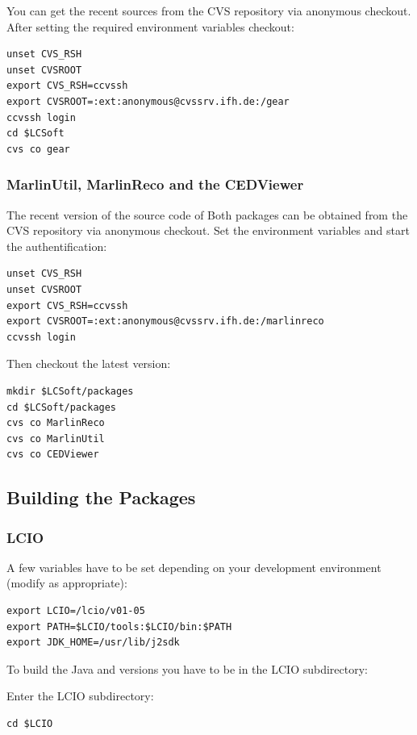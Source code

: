 You can get the recent sources from the CVS repository via anonymous checkout.
After setting the required environment variables checkout:

\begin{verbatim}
unset CVS_RSH
unset CVSROOT
export CVS_RSH=ccvssh
export CVSROOT=:ext:anonymous@cvssrv.ifh.de:/gear
ccvssh login
cd $LCSoft
cvs co gear
\end{verbatim}

\subsubsection*{MarlinUtil, MarlinReco and the CEDViewer}

The recent version of the source code of Both packages can be 
obtained from the CVS repository via anonymous checkout.
Set the environment variables and start the authentification: 

\begin{verbatim}
unset CVS_RSH
unset CVSROOT
export CVS_RSH=ccvssh 
export CVSROOT=:ext:anonymous@cvssrv.ifh.de:/marlinreco
ccvssh login
\end{verbatim}

Then checkout the latest version: 

\begin{verbatim}
mkdir $LCSoft/packages 
cd $LCSoft/packages 
cvs co MarlinReco 
cvs co MarlinUtil 
cvs co CEDViewer 
\end{verbatim}

\subsection{Building the Packages}

\subsubsection*{LCIO}

A few variables have to be set depending on your development
environment (modify as appropriate):

\begin{verbatim}
export LCIO=/lcio/v01-05 
export PATH=$LCIO/tools:$LCIO/bin:$PATH 
export JDK_HOME=/usr/lib/j2sdk
\end{verbatim}

To build the Java and \CPP{} versions you have to be in the LCIO subdirectory:

Enter the LCIO subdirectory:

\begin{verbatim}
cd $LCIO 
\end{verbatim}

